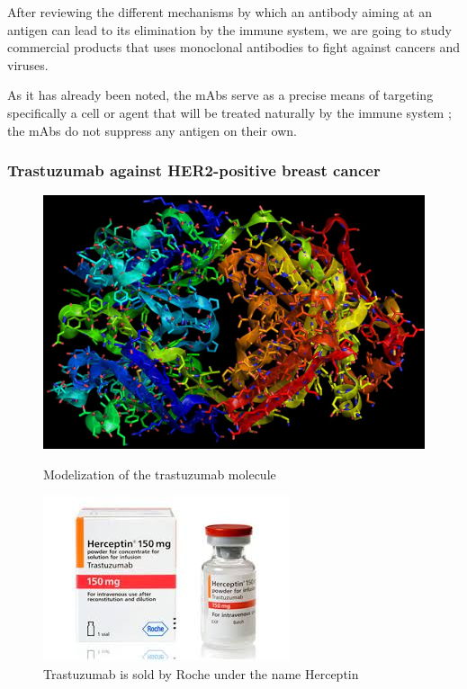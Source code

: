 After reviewing the different mechanisms by which an antibody aiming at
an antigen can lead to its elimination by the immune system, we are going
to study commercial products that uses monoclonal antibodies to fight
against cancers and viruses.

As it has already been noted, the mAbs serve as a precise means of targeting
specifically a cell or agent that will be treated naturally by the immune system ; 
the mAbs do not suppress any antigen on their own.

\subsubsection{Trastuzumab against HER2-positive breast cancer}

\begin{figure}[H]
    \begin{minipage}{0.495\textwidth}
            \centering
            \includegraphics[width=\textwidth]{../Images/herceptin.jpg}
            \caption{Modelization of the trastuzumab molecule}
            \label{fig:trastuzumab}
    \end{minipage}\hfill
    \begin{minipage}{0.495\textwidth}
            \centering
            \includegraphics[width=\textwidth]{../Images/trastuzumab.jpg}
            \caption{Trastuzumab is sold by Roche under the name Herceptin
            \cite{roche_herceptin_nodate}}
            \label{fig:herceptin}
    \end{minipage}
\end{figure}

